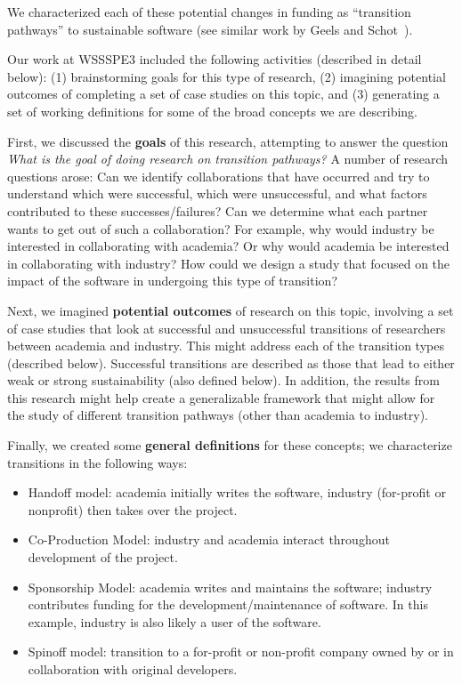We characterized each of these potential changes in funding as ``transition
pathways'' to sustainable software (see similar work by Geels and
Schot~\cite{Geels:2007}).

Our work at WSSSPE3 included the following activities (described in detail
below): (1) brainstorming goals for this type of research, (2) imagining
potential outcomes of completing a set of case studies on this topic, and (3)
generating a set of working definitions for some of the broad concepts we are
describing.

First, we discussed the \textbf{goals} of this research, attempting to answer the 
question \emph{What is the goal of doing research on transition pathways?}
A number of research questions arose:  Can we identify collaborations that have 
occurred and try to understand which were successful, which were unsuccessful, 
and what factors contributed to these successes/failures? Can we determine what 
each partner wants to get out of such a collaboration? For example, why would 
industry be interested in collaborating with academia? Or why would academia 
be interested in collaborating with industry? How could we design a study that 
focused on the impact of the software in undergoing this type of transition?

Next, we imagined \textbf{potential outcomes} of research on this topic, involving 
a set of case studies that look at successful and unsuccessful
transitions of researchers between academia and industry. This might address 
each of the transition types (described below). Successful transitions are
described as those that lead to either weak or strong sustainability (also
defined below). In addition, the results from this research might help create a 
generalizable framework that might allow for the study of different transition 
pathways (other than academia to industry).

Finally, we created some \textbf{general definitions} for these concepts; we 
characterize transitions in the following ways:
\begin{itemize}

\item Handoff model: academia initially writes the software, industry (for-profit 
or nonprofit) then takes over the project.

\item Co-Production Model: industry and academia interact throughout development
of the project.

\item Sponsorship Model: academia writes and maintains the software; 
industry contributes funding for the development\slash maintenance of software.
In this example, industry is also likely a user of the software.

\item Spinoff model: transition to a for-profit or non-profit company owned by or in
collaboration with original developers.

\end{itemize}

